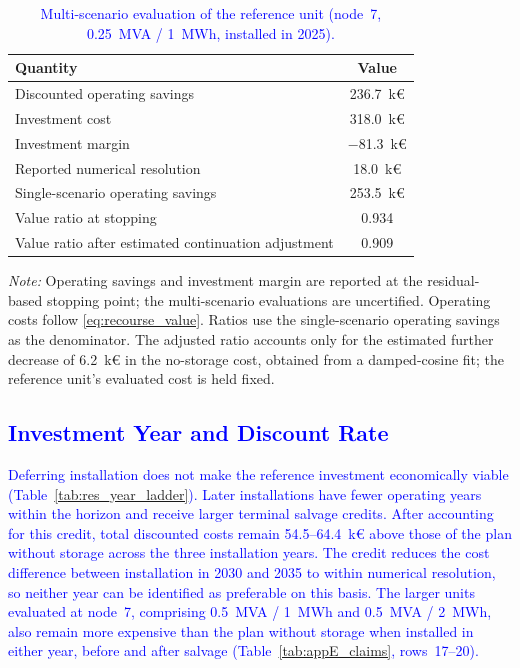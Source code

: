 \documentclass[preprint,12pt]{elsarticle}
\begin{document}
\begin{table}[htbp!]
    \centering
    \caption{\textcolor{blue}{Multi-scenario evaluation of the reference unit (node~7, 0.25~MVA / 1~MWh, installed in 2025).}}
    \label{tab:res_multiscenario}
    \footnotesize\setlength{\tabcolsep}{5pt}
    \begin{tabular}{l c}
        \toprule
        Quantity & Value \\
        \midrule
        Discounted operating savings & 236.7~k\euro{} \\
        Investment cost & 318.0~k\euro{} \\
        Investment margin & $-$81.3~k\euro{} \\
        Reported numerical resolution & 18.0~k\euro{} \\
        Single-scenario operating savings & 253.5~k\euro{} \\
        Value ratio at stopping & 0.934 \\
        Value ratio after estimated continuation adjustment & 0.909 \\
        \bottomrule
    \end{tabular}
    \par\smallskip
    \begin{minipage}{\linewidth}
        \footnotesize\raggedright
        \textit{Note:}
        Operating savings and investment margin are reported at the residual-based stopping point; the multi-scenario evaluations are uncertified.
        Operating costs follow \eqref{eq:recourse_value}.
        Ratios use the single-scenario operating savings as the denominator.
        The adjusted ratio accounts only for the estimated further decrease of 6.2~k\euro{} in the no-storage cost, obtained from a damped-cosine fit; the reference unit's evaluated cost is held fixed.
    \end{minipage}
\end{table}

\subsection{\textcolor{blue}{Investment Year and Discount Rate}}
\label{subsec:res_sensitivities}

\textcolor{blue}{
    Deferring installation does not make the reference investment economically viable (Table~\ref{tab:res_year_ladder}). Later installations have fewer operating years within the horizon and receive larger terminal salvage credits. After accounting for this credit, total discounted costs remain 54.5--64.4~k\euro{} above those of the plan without storage across the three installation years. The credit reduces the cost difference between installation in 2030 and 2035 to within numerical resolution, so neither year can be identified as preferable on this basis. The larger units evaluated at node~7, comprising 0.5~MVA / 1~MWh and 0.5~MVA / 2~MWh, also remain more expensive than the plan without storage when installed in either year, before and after salvage (Table~\ref{tab:appE_claims}, rows~17--20).
}
\end{document}
